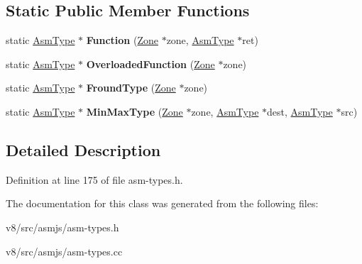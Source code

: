 \subsection*{Static Public Member Functions}
\begin{DoxyCompactItemize}
\item 
\mbox{\label{classv8_1_1internal_1_1wasm_1_1AsmType_a2bf7ea5fd4c8c02951086a8887269c1c}} 
static \mbox{\hyperlink{classv8_1_1internal_1_1wasm_1_1AsmType}{Asm\+Type}} $\ast$ {\bfseries Function} (\mbox{\hyperlink{classv8_1_1internal_1_1Zone}{Zone}} $\ast$zone, \mbox{\hyperlink{classv8_1_1internal_1_1wasm_1_1AsmType}{Asm\+Type}} $\ast$ret)
\item 
\mbox{\label{classv8_1_1internal_1_1wasm_1_1AsmType_a899f358a918cdc77c783460ad3e6c086}} 
static \mbox{\hyperlink{classv8_1_1internal_1_1wasm_1_1AsmType}{Asm\+Type}} $\ast$ {\bfseries Overloaded\+Function} (\mbox{\hyperlink{classv8_1_1internal_1_1Zone}{Zone}} $\ast$zone)
\item 
\mbox{\label{classv8_1_1internal_1_1wasm_1_1AsmType_a273148d675e9f994f4cad807c991f7b1}} 
static \mbox{\hyperlink{classv8_1_1internal_1_1wasm_1_1AsmType}{Asm\+Type}} $\ast$ {\bfseries Fround\+Type} (\mbox{\hyperlink{classv8_1_1internal_1_1Zone}{Zone}} $\ast$zone)
\item 
\mbox{\label{classv8_1_1internal_1_1wasm_1_1AsmType_abfac15e97979faeb195cc39acc3774d2}} 
static \mbox{\hyperlink{classv8_1_1internal_1_1wasm_1_1AsmType}{Asm\+Type}} $\ast$ {\bfseries Min\+Max\+Type} (\mbox{\hyperlink{classv8_1_1internal_1_1Zone}{Zone}} $\ast$zone, \mbox{\hyperlink{classv8_1_1internal_1_1wasm_1_1AsmType}{Asm\+Type}} $\ast$dest, \mbox{\hyperlink{classv8_1_1internal_1_1wasm_1_1AsmType}{Asm\+Type}} $\ast$src)
\end{DoxyCompactItemize}


\subsection{Detailed Description}


Definition at line 175 of file asm-\/types.\+h.



The documentation for this class was generated from the following files\+:\begin{DoxyCompactItemize}
\item 
v8/src/asmjs/asm-\/types.\+h\item 
v8/src/asmjs/asm-\/types.\+cc\end{DoxyCompactItemize}
